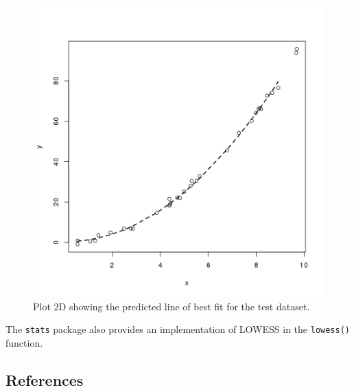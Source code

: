 

\begin{figure}[htp]
\centering
\includegraphics[scale=0.45]{a_regression/locally_estimated_scatterplot_smoothing_result.png}
\caption{Plot 2D showing the predicted line of best fit for the test dataset.}
\label{plot:locally_estimated_scatterplot_smoothing_result}
\end{figure}

The \texttt{stats} package also provides an implementation of LOWESS in the \texttt{lowess()} function.

\subsection{References}

